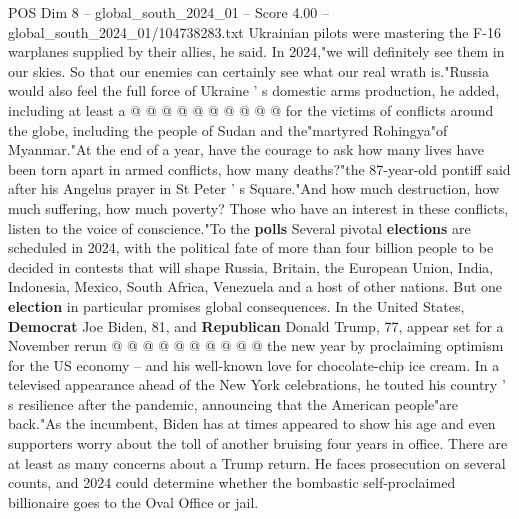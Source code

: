 \begin{textsample}{POS Dim 8 – global\_south\_2024\_01 – Score 4.00 – global\_south\_2024\_01/104738283.txt}
Ukrainian pilots were mastering the F-16 warplanes supplied by their allies, he said.
In 2024,"we will definitely see them in our skies.
So that our enemies can certainly see what our real wrath is."Russia would also feel the full force of Ukraine ' s domestic arms production, he added, including at least a @ @ @ @ @ @ @ @ @ @ for the victims of conflicts around the globe, including the people of Sudan and the"martyred Rohingya"of Myanmar."At the end of a year, have the courage to ask how many lives have been torn apart in armed conflicts, how many deaths?"the 87-year-old pontiff said after his Angelus prayer in St Peter ' s Square."And how much destruction, how much suffering, how much poverty?
Those who have an interest in these conflicts, listen to the voice of conscience."To the \textbf{polls} Several pivotal \textbf{elections} are scheduled in 2024, with the political fate of more than four billion people to be decided in contests that will shape Russia, Britain, the European Union, India, Indonesia, Mexico, South Africa, Venezuela and a host of other nations.
But one \textbf{election} in particular promises global consequences.
In the United States, \textbf{Democrat} Joe Biden, 81, and \textbf{Republican} Donald Trump, 77, appear set for a November rerun @ @ @ @ @ @ @ @ @ @ the new year by proclaiming optimism for the US economy -- and his well-known love for chocolate-chip ice cream.
In a televised appearance ahead of the New York celebrations, he touted his country ' s resilience after the pandemic, announcing that the American people"are back."As the incumbent, Biden has at times appeared to show his age and even supporters worry about the toll of another bruising four years in office.
There are at least as many concerns about a Trump return.
He faces prosecution on several counts, and 2024 could determine whether the bombastic self-proclaimed billionaire goes to the Oval Office or jail.

\end{textsample}
